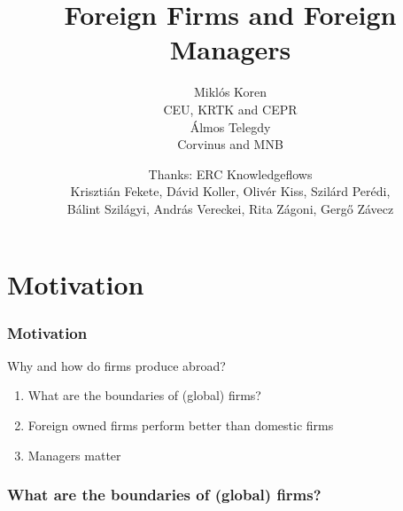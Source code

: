 \documentclass[aspectratio=43,compress,mathserif]{beamer}
\title{Foreign Firms and Foreign Managers}
\author{Miklós Koren\\
CEU, KRTK and CEPR\\
Álmos Telegdy\\
Corvinus and MNB}
\date %
{Thanks: ERC Knowledgeflows\\Krisztián Fekete, Dávid Koller, Olivér Kiss, Szilárd Perédi,\\ Bálint Szilágyi, András Vereckei, Rita Zágoni, Gergő Závecz}
\begin{document}
\begin{frame}[plain]
  \titlepage
    \addtocounter{framenumber}{-1}
\end{frame}






\section{Motivation}\hypertarget{Motivation}{}
\begin{frame}\frametitle{Motivation}\hypertarget{Motivation}{}
Why and how do firms produce abroad?


\begin{enumerate}\setcounter{enumi}{0}
\item What are the boundaries of (global) firms?

\item Foreign owned firms perform better than domestic firms

\item Managers matter




\end{enumerate}
\end{frame}



\begin{frame}\frametitle{What are the boundaries of (global) firms?}\hypertarget{What are the boundaries of (global) firms?}{}








\end{frame}
\end{document}
